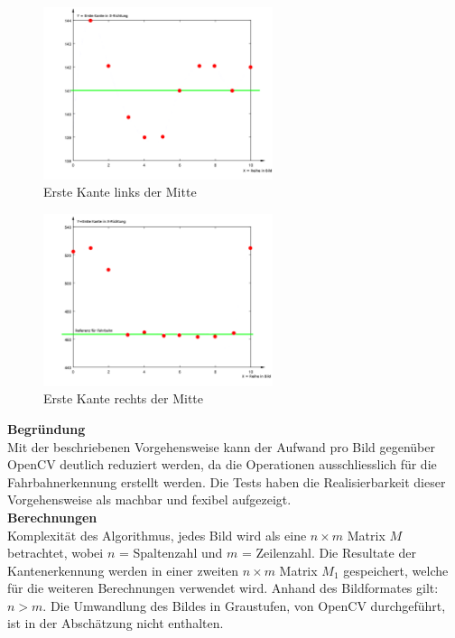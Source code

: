 \begin{figure}[H]
\centering
\includegraphics[width=0.6\textwidth]{03_Loesungskonzept/pictures/minEdge.png}
\caption{Erste Kante links der Mitte}
\label{fig:kantenl}
\end{figure}
\begin{figure}[H]
\centering
\includegraphics[width=0.6\textwidth]{03_Loesungskonzept/pictures/maxEdge.png}
\caption{Erste Kante rechts der Mitte}
\label{fig:kantenr}
\end{figure}\flushleft
\textbf{Begründung}\\[0.2cm]
Mit der beschriebenen Vorgehensweise kann der Aufwand pro Bild gegenüber OpenCV deutlich reduziert werden, da die Operationen ausschliesslich für die Fahrbahnerkennung erstellt werden. Die Tests haben die Realisierbarkeit dieser Vorgehensweise als machbar und fexibel aufgezeigt.\\[0.2cm]
\textbf{Berechnungen}\\[0.2cm]
Komplexität des Algorithmus, jedes Bild wird als eine $n\times{m}$ Matrix $M$ betrachtet, wobei $n$ = Spaltenzahl und $m$ = Zeilenzahl. Die Resultate der Kantenerkennung werden in einer zweiten $n\times{m}$ Matrix $M_1$ gespeichert, welche für die weiteren Berechnungen verwendet wird. Anhand des Bildformates gilt: $n>m$. Die Umwandlung des Bildes in Graustufen, von OpenCV durchgeführt, ist in der Abschätzung nicht enthalten.
